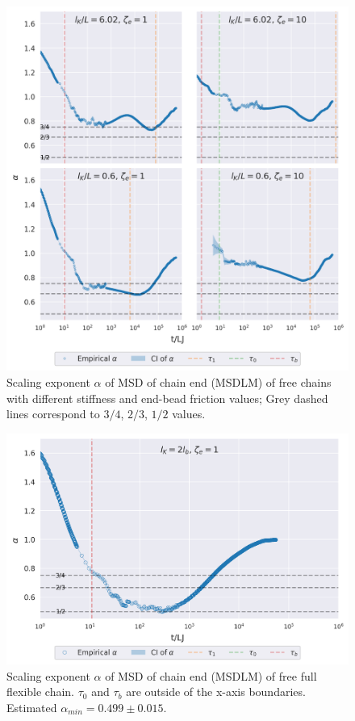 \documentclass[
    paper=A4,pagesize=automedia,fontsize=12pt,
    BCOR=15mm,DIV=22,
    twoside,headinclude,footinclude=false,
    fleqn,             %
    bibliography=totocnumbered,          %
    listof=totoc,                %
    listof=flat,                 %
    cleardoublepage=empty      %
    numbers=endperiod
]{scrartcl}
\begin{document}
\begin{figure}
    \centering
    \includegraphics[width=\textwidth]{17+18+19+20-exp-alpha.png}
    \caption{Scaling exponent $\alpha$ of MSD of chain end (MSDLM) 
    of free chains with different stiffness and end-bead friction values;
    Grey dashed lines correspond to $3/4$, $2/3$, $1/2$ values.
    }
    \label{fig:alpha_free}
\end{figure}

\begin{figure}
    \centering
    \includegraphics[width=\textwidth]{17+18+19+20-exp-full-flex-alpha.png}
    \caption{Scaling exponent $\alpha$ of MSD of chain end (MSDLM) 
    of free full flexible chain. $\tau_0$ and $\tau_b$ are outside of the
    x-axis boundaries. Estimated $\alpha_{min}=0.499 \pm 0.015$.
    }
    \label{fig:alpha_free_full_flex}
\end{figure}
\end{document}
